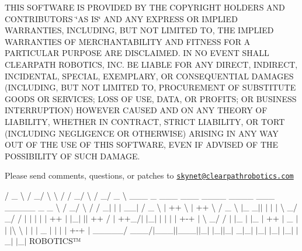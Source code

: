T\+H\+IS S\+O\+F\+T\+W\+A\+RE IS P\+R\+O\+V\+I\+D\+ED BY T\+HE C\+O\+P\+Y\+R\+I\+G\+HT H\+O\+L\+D\+E\+RS A\+ND C\+O\+N\+T\+R\+I\+B\+U\+T\+O\+RS \char`\"{}\+A\+S I\+S\char`\"{} A\+ND A\+NY E\+X\+P\+R\+E\+SS OR I\+M\+P\+L\+I\+ED W\+A\+R\+R\+A\+N\+T\+I\+ES, I\+N\+C\+L\+U\+D\+I\+NG, B\+UT N\+OT L\+I\+M\+I\+T\+ED TO, T\+HE I\+M\+P\+L\+I\+ED W\+A\+R\+R\+A\+N\+T\+I\+ES OF M\+E\+R\+C\+H\+A\+N\+T\+A\+B\+I\+L\+I\+TY A\+ND F\+I\+T\+N\+E\+SS F\+OR A P\+A\+R\+T\+I\+C\+U\+L\+AR P\+U\+R\+P\+O\+SE A\+RE D\+I\+S\+C\+L\+A\+I\+M\+ED. IN NO E\+V\+E\+NT S\+H\+A\+LL C\+L\+E\+A\+R\+P\+A\+TH R\+O\+B\+O\+T\+I\+CS, I\+NC. BE L\+I\+A\+B\+LE F\+OR A\+NY D\+I\+R\+E\+CT, I\+N\+D\+I\+R\+E\+CT, I\+N\+C\+I\+D\+E\+N\+T\+AL, S\+P\+E\+C\+I\+AL, E\+X\+E\+M\+P\+L\+A\+RY, OR C\+O\+N\+S\+E\+Q\+U\+E\+N\+T\+I\+AL D\+A\+M\+A\+G\+ES (I\+N\+C\+L\+U\+D\+I\+NG, B\+UT N\+OT L\+I\+M\+I\+T\+ED TO, P\+R\+O\+C\+U\+R\+E\+M\+E\+NT OF S\+U\+B\+S\+T\+I\+T\+U\+TE G\+O\+O\+DS OR S\+E\+R\+V\+I\+C\+ES; L\+O\+SS OF U\+SE, D\+A\+TA, OR P\+R\+O\+F\+I\+TS; OR B\+U\+S\+I\+N\+E\+SS I\+N\+T\+E\+R\+R\+U\+P\+T\+I\+ON) H\+O\+W\+E\+V\+ER C\+A\+U\+S\+ED A\+ND ON A\+NY T\+H\+E\+O\+RY OF L\+I\+A\+B\+I\+L\+I\+TY, W\+H\+E\+T\+H\+ER IN C\+O\+N\+T\+R\+A\+CT, S\+T\+R\+I\+CT L\+I\+A\+B\+I\+L\+I\+TY, OR T\+O\+RT (I\+N\+C\+L\+U\+D\+I\+NG N\+E\+G\+L\+I\+G\+E\+N\+CE OR O\+T\+H\+E\+R\+W\+I\+SE) A\+R\+I\+S\+I\+NG IN A\+NY W\+AY O\+UT OF T\+HE U\+SE OF T\+H\+IS S\+O\+F\+T\+W\+A\+RE, E\+V\+EN IF A\+D\+V\+I\+S\+ED OF T\+HE P\+O\+S\+S\+I\+B\+I\+L\+I\+TY OF S\+U\+CH D\+A\+M\+A\+GE.

Please send comments, questions, or patches to \href{mailto:skynet@clearpathrobotics.com}{\tt skynet@clearpathrobotics.\+com}



 / \+\_\+ \textbackslash{} / \+\_\+/ \textbackslash{} \textbackslash{} / / \+\_\+/ \textbackslash{} / \+\_\+/ \+\_\+ \textbackslash{} \+\_\+\+\_\+\+\_\+ \+\_\+ \+\_\+\+\_\+\+\_\+ \+\_\+\+\_\+\+\_\+ \+\_\+\+\_\+\+\_\+\+\_\+ \+\_\+\+\_\+\+\_\+\+\_\+ \+\_\+\+\_\+\+\_\+ \+\_\+\+\_\+\+\_\+\+\_\+\+\_\+ \+\_\+ \+\_\+ \textbackslash{} / \+\_\+/ \textbackslash{} / / \+\_\+$|$ $\vert$ $\vert$ \+\_\+\+\_\+$\vert$ / \+\_\+ \textbackslash{} $\vert$ ++ \textbackslash{} $\vert$ ++ \textbackslash{} / \+\_\+ \textbackslash{} $\vert$\+\_\+ \+\_\+$\vert$$\vert$ $\vert$ $\vert$ $\vert$ \textbackslash{} \+\_\+/ \+\_\+/ / $\vert$ $\vert$ $\vert$ $\vert$ $\vert$ ++ $\vert$ $\vert$\+\_\+$\vert$ $\vert$$\vert$ ++ / $\vert$ ++\+\_\+/$\vert$ $\vert$\+\_\+$\vert$ $\vert$ $\vert$ $\vert$ $\vert$ +-\/+ $\vert$ \textbackslash{} \+\_\+/ / $\vert$ $\vert$\+\_\+ $\vert$ $\vert$\+\_\+ $\vert$ ++ $\vert$ \+\_\+ $\vert$$\vert$ $\vert$\textbackslash{} \textbackslash{} $\vert$ $\vert$ $\vert$ \+\_\+ $\vert$ $\vert$ $\vert$ $\vert$ +-\/+ $\vert$ \+\_\+\+\_\+\+\_\+\+\_\+\+\_\+/ \+\_\+\+\_\+\+\_\+/$\vert$\+\_\+\+\_\+\+\_\+$\vert$$\vert$\+\_\+\+\_\+\+\_\+$\vert$$\vert$\+\_\+$\vert$ $\vert$\+\_\+$\vert$$\vert$\+\_\+$\vert$ \+\_\+$|$\+\_\+$\vert$ $\vert$\+\_\+$\vert$ $\vert$\+\_\+$\vert$ $\vert$\+\_\+$\vert$ $\vert$\+\_\+$\vert$ $\vert$\+\_\+$\vert$ R\+O\+B\+O\+T\+I\+C\+S™

